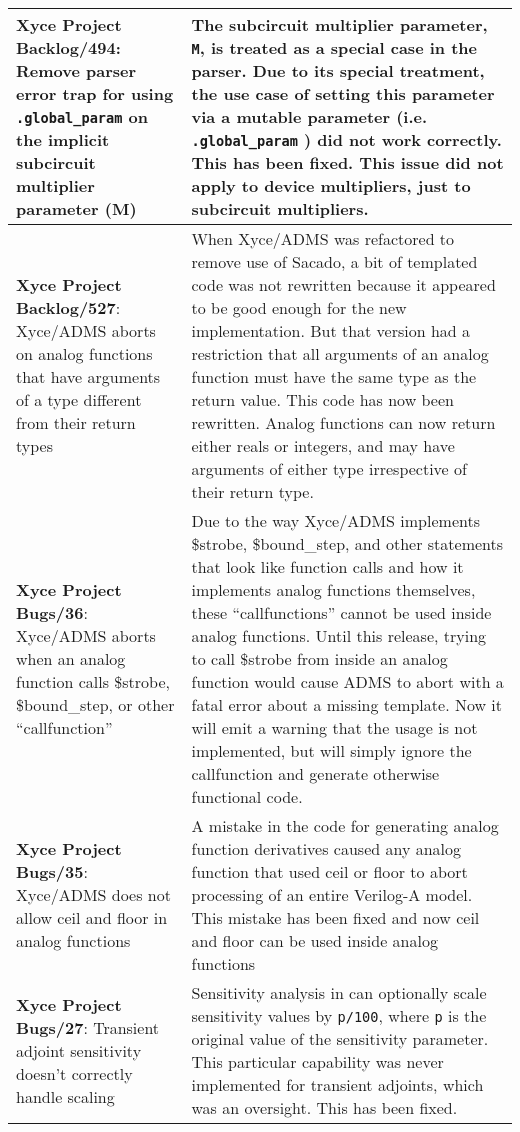 {\begin{longtable}[h] {>{\raggedright\small}m{2in}|>{\raggedright\let\\\tabularnewline\small}m{3.5in}}
  \textbf{Xyce Project Backlog/494}: Remove parser error trap for
  using \texttt{.global\_param} on the implicit subcircuit multiplier
  parameter (M) & The subcircuit multiplier parameter, \texttt{M}, is
  treated as a special case in the \Xyce{} parser.  Due to its special
  treatment, the use case of setting this parameter via a mutable
  parameter (i.e.  \texttt{.global\_param} ) did not work correctly.
  This has been fixed. This issue did not apply to device multipliers,
  just to subcircuit multipliers.  \\ \hline

  \textbf{Xyce Project Backlog/527}: Xyce/ADMS aborts on analog
  functions that have arguments of a type different from their return
  types & When Xyce/ADMS was refactored to remove use of Sacado, a bit
  of templated code was not rewritten because it appeared to be good
  enough for the new implementation.  But that version had a
  restriction that all arguments of an analog function must have the
  same type as the return value.  This code has now been
  rewritten. Analog functions can now return either reals or integers,
  and may have arguments of either type irrespective of their return
  type.  \\ \hline

  \textbf{Xyce Project Bugs/36}: Xyce/ADMS aborts when an analog
  function calls \$strobe, \$bound\_step, or other ``callfunction'' &
  Due to the way Xyce/ADMS implements \$strobe, \$bound\_step, and
  other statements that look like function calls and how it implements
  analog functions themselves, these ``callfunctions'' cannot be used
  inside analog functions.  Until this release, trying to
  call \$strobe from inside an analog function would cause ADMS to
  abort with a fatal error about a missing template.  Now it will emit
  a warning that the usage is not implemented, but will simply ignore
  the callfunction and generate otherwise functional code. \\ \hline

  \textbf{Xyce Project Bugs/35}: Xyce/ADMS does not allow ceil and
  floor in analog functions & A mistake in the code for generating
  analog function derivatives caused any analog function that used
  ceil or floor to abort processing of an entire Verilog-A model.
  This mistake has been fixed and now ceil and floor can be used
  inside analog functions \\ \hline

  \textbf{Xyce Project Bugs/27}: Transient adjoint sensitivity doesn't
  correctly handle scaling & Sensitivity analysis in \Xyce{} can
  optionally scale sensitivity values by \texttt{p/100},
  where \texttt{p} is the original value of the sensitivity parameter.
  This particular capability was never implemented for transient
  adjoints, which was an oversight.  This has been fixed.  \\ \hline


\end{longtable}}
